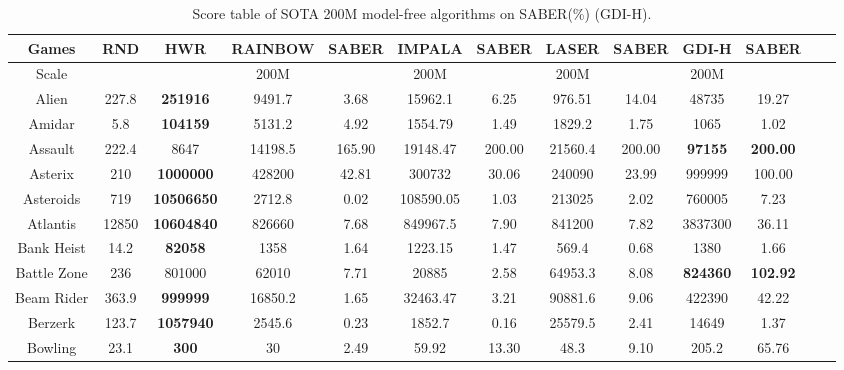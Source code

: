 \documentclass[nohyperref]{article}
\theoremstyle{plain}
\begin{document}
\begin{table}[!hb]
\footnotesize
\begin{center}
\caption{Score table of SOTA 200M model-free algorithms on SABER(\%)  (GDI-H).}
\setlength{\tabcolsep}{1.0pt}
\begin{tabular}{ |c |c |c| c c| c c|  c c |c c |c c |}
\hline
Games & RND & HWR & RAINBOW & SABER & IMPALA & SABER & LASER & SABER  & GDI-H & SABER\\
\hline
Scale  &     &       & 200M   &       &  200M    &        & 200M   & &  200M   & \\
\hline
 Alien              & 227.8     & \textbf{251916}    & 9491.7   &3.68    & 15962.1    & 6.25       & 976.51  & 14.04       &48735             &19.27  \\
 Amidar             & 5.8       & \textbf{104159}    & 5131.2   &4.92    & 1554.79    & 1.49       & 1829.2  & 1.75        &1065              &1.02           \\
 Assault            & 222.4     & 8647               & 14198.5  &165.90  & 19148.47   & 200.00     & 21560.4 & 200.00    &\textbf{97155}     &\textbf{200.00} \\
 Asterix            & 210       & \textbf{1000000}   & 428200   &42.81   & 300732     & 30.06      & 240090  & 23.99     &999999            &100.00\\
 Asteroids          & 719       & \textbf{10506650}  & 2712.8   &0.02    & 108590.05  & 1.03       & 213025  & 2.02         &760005            &7.23\\
 Atlantis           & 12850     & \textbf{10604840}  & 826660   &7.68    & 849967.5   & 7.90       & 841200  & 7.82       &3837300           &36.11\\
 Bank Heist         & 14.2      & \textbf{82058}     & 1358     &1.64    & 1223.15    & 1.47       & 569.4   & 0.68        &1380              &1.66 \\
 Battle Zone        & 236       &801000    & 62010    &7.71    & 20885      & 2.58       & 64953.3 & 8.08        &\textbf{824360}            &\textbf{102.92} \\
 Beam Rider         & 363.9     & \textbf{999999}    & 16850.2  &1.65    & 32463.47   & 3.21       & 90881.6 & 9.06       &422390            &42.22 \\
 Berzerk            & 123.7     & \textbf{1057940}            & 2545.6   &0.23    & 1852.7     & 0.16       & 25579.5 & 2.41      &14649             &1.37             \\
 Bowling            & 23.1      & \textbf{300}       & 30       &2.49    & 59.92      & 13.30      & 48.3    & 9.10         &205.2             &65.76\\

\end{tabular}
\end{center}
\end{table}
\end{document}
